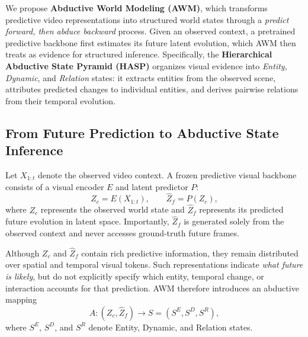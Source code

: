 \documentclass{article}
\begin{document}
We propose \textbf{Abductive World Modeling (AWM)}, which transforms predictive video representations into structured world states through a \emph{predict forward, then abduce backward} process. Given an observed context, a pretrained predictive backbone first estimates its future latent evolution, which AWM then treats as evidence for structured inference. Specifically, the \textbf{Hierarchical Abductive State Pyramid (HASP)} organizes visual evidence into \textit{Entity}, \textit{Dynamic}, and \textit{Relation} states: it extracts entities from the observed scene, attributes predicted changes to individual entities, and derives pairwise relations from their temporal evolution.


\subsection{From Future Prediction to Abductive State Inference}
Let $X_{1:t}$ denote the observed video context. A frozen predictive visual backbone consists of a visual encoder $E$ and latent predictor $P$:
\begin{equation}
    Z_c = E(X_{1:t}),
    \qquad
    \widehat{Z}_f = P(Z_c),
    \label{eq:forward-prediction}
\end{equation}
where $Z_c$ represents the observed world state and $\widehat{Z}_f$ represents its predicted future evolution in latent space. Importantly, $\widehat{Z}_f$ is generated solely from the observed context and never accesses ground-truth future frames.

Although $Z_c$ and $\widehat{Z}_f$ contain rich predictive information, they remain distributed over spatial and temporal visual tokens. Such representations indicate \emph{what future is likely}, but do not explicitly specify which entity, temporal change, or interaction accounts for that prediction. AWM therefore introduces an abductive mapping
\begin{equation}
    A:
    (Z_c,\widehat{Z}_f)
    \rightarrow
    S
    =
    \left(S^E,S^D,S^R\right),
    \label{eq:state}
\end{equation}
where $S^E$, $S^D$, and $S^R$ denote Entity, Dynamic, and Relation states.
\end{document}
